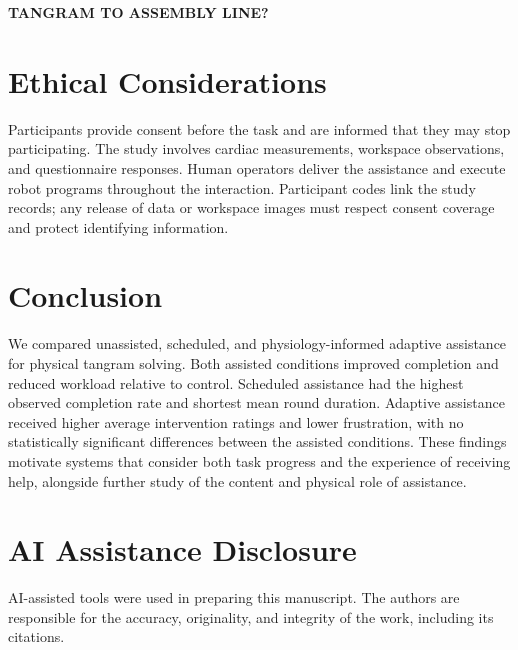 \documentclass[sigconf]{aamas}
\begin{document}
\textbf{TANGRAM TO ASSEMBLY LINE?}

\section{Ethical Considerations}

Participants provide consent before the task and are informed that they may stop participating. The study involves cardiac measurements, workspace observations, and questionnaire responses. Human operators deliver the assistance and execute robot programs throughout the interaction. Participant codes link the study records; any release of data or workspace images must respect consent coverage and protect identifying information.

\section{Conclusion}

We compared unassisted, scheduled, and physiology-informed adaptive assistance for physical tangram solving. Both assisted conditions improved completion and reduced workload relative to control. Scheduled assistance had the highest observed completion rate and shortest mean round duration. Adaptive assistance received higher average intervention ratings and lower frustration, with no statistically significant differences between the assisted conditions. These findings motivate systems that consider both task progress and the experience of receiving help, alongside further study of the content and physical role of assistance.

\section*{AI Assistance Disclosure}

AI-assisted tools were used in preparing this manuscript. The authors are responsible for the accuracy, originality, and integrity of the work, including its citations.



\end{document}
